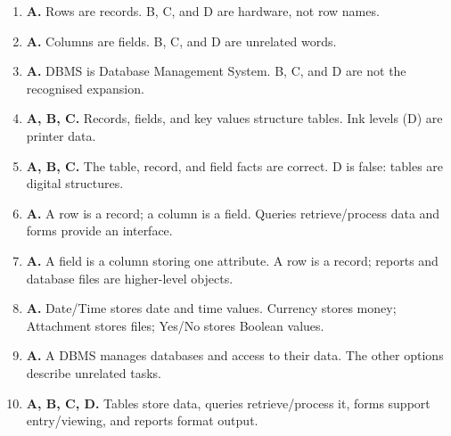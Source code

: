\begin{enumerate}[label=\textbf{Q\arabic*.}, leftmargin=*]
\item \textbf{A.} Rows are records. B, C, and D are hardware, not row names.
\item \textbf{A.} Columns are fields. B, C, and D are unrelated words.
\item \textbf{A.} DBMS is Database Management System. B, C, and D are not the recognised expansion.
\item \textbf{A, B, C.} Records, fields, and key values structure tables. Ink levels (D) are printer data.
\item \textbf{A, B, C.} The table, record, and field facts are correct. D is false: tables are digital structures.
\item \textbf{A.} A row is a record; a column is a field. Queries retrieve/process data and forms provide an interface.

\item \textbf{A.} A field is a column storing one attribute. A row is a record; reports and database files are higher-level objects.

\item \textbf{A.} Date/Time stores date and time values. Currency stores money; Attachment stores files; Yes/No stores Boolean values.

\item \textbf{A.} A DBMS manages databases and access to their data. The other options describe unrelated tasks.

\item \textbf{A, B, C, D.} Tables store data, queries retrieve/process it, forms support entry/viewing, and reports format output.

\end{enumerate}
